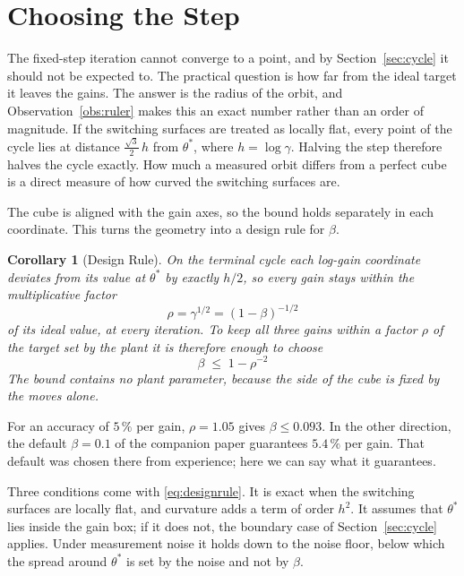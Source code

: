 \documentclass[letterpaper, 10pt, conference, twocolumn]{ieeeconf}
\newtheorem{corollary}{Corollary}
\begin{document}
\section{Choosing the Step}
\label{sec:size}

The fixed-step iteration cannot converge to a point, and by
Section~\ref{sec:cycle} it should not be expected to. The practical question is
how far from the ideal target it leaves the gains. The answer is the radius of
the orbit, and Observation~\ref{obs:ruler} makes this an exact number rather
than an order of magnitude. If the switching surfaces are treated as locally
flat, every point of the cycle lies at distance $\tfrac{\sqrt{3}}{2}\, h$ from
$\theta^*$, where $h = \log\gamma$. Halving the step therefore halves the
cycle exactly. How much a measured orbit differs from a perfect cube is a
direct measure of how curved the switching surfaces are.

The cube is aligned with the gain axes, so the bound holds separately in each
coordinate. This turns the geometry into a design rule for $\beta$.

\begin{corollary}[Design Rule]
\label{cor:design}
On the terminal cycle each log-gain coordinate deviates from its value at
$\theta^*$ by exactly $h/2$, so every gain stays within the multiplicative
factor
\begin{equation}
\rho = \gamma^{1/2} = (1-\beta)^{-1/2}
\label{eq:designfwd}
\end{equation}
of its ideal value, at every iteration. To keep all three gains within a
factor $\rho$ of the target set by the plant it is therefore enough to choose
\begin{equation}
\boxed{\;\beta \;\le\; 1 - \rho^{-2}\;}
\label{eq:designrule}
\end{equation}
The bound contains no plant parameter, because the side of the cube is fixed
by the moves alone.
\end{corollary}

For an accuracy of $5\,\%$ per gain, $\rho = 1.05$ gives $\beta \le 0.093$. In
the other direction, the default $\beta = 0.1$ of the companion paper
guarantees $5.4\,\%$ per gain. That default was chosen there from experience;
here we can say what it guarantees.

Three conditions come with \eqref{eq:designrule}. It is exact when the
switching surfaces are locally flat, and curvature adds a term of order $h^2$.
It assumes that $\theta^*$ lies inside the gain box; if it does not, the
boundary case of Section~\ref{sec:cycle} applies. Under measurement noise it
holds down to the noise floor, below which the spread around $\theta^*$ is set
by the noise and not by $\beta$.
\end{document}
